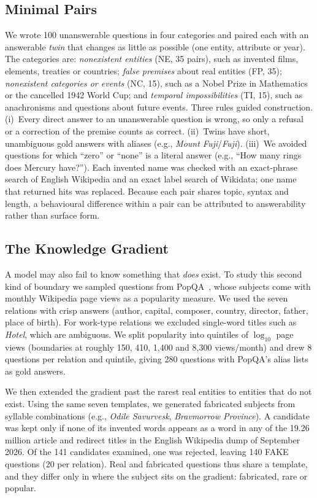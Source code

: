 \subsection{Minimal Pairs}
We wrote 100 unanswerable questions in four categories and paired each with an answerable \emph{twin} that changes as little as possible (one entity, attribute or year). The categories are: \emph{nonexistent entities} (NE, 35 pairs), such as invented films, elements, treaties or countries; \emph{false premises} about real entities (FP, 35); \emph{nonexistent categories or events} (NC, 15), such as a Nobel Prize in Mathematics or the cancelled 1942 World Cup; and \emph{temporal impossibilities} (TI, 15), such as anachronisms and questions about future events. Three rules guided construction. (i)~Every direct answer to an unanswerable question is wrong, so only a refusal or a correction of the premise counts as correct. (ii)~Twins have short, unambiguous gold answers with aliases (e.g., \emph{Mount Fuji}/\emph{Fuji}). (iii)~We avoided questions for which ``zero'' or ``none'' is a literal answer (e.g., ``How many rings does Mercury have?''). Each invented name was checked with an exact-phrase search of English Wikipedia and an exact label search of Wikidata; one name that returned hits was replaced. Because each pair shares topic, syntax and length, a behavioural difference within a pair can be attributed to answerability rather than surface form.

\subsection{The Knowledge Gradient}
A model may also fail to know something that \emph{does} exist. To study this second kind of boundary we sampled questions from PopQA~\cite{mallen2023popqa}, whose subjects come with monthly Wikipedia page views as a popularity measure. We used the seven relations with crisp answers (author, capital, composer, country, director, father, place of birth). For work-type relations we excluded single-word titles such as \emph{Hotel}, which are ambiguous. We split popularity into quintiles of $\log_{10}$ page views (boundaries at roughly 150, 410, 1{,}400 and 8{,}300 views/month) and drew 8 questions per relation and quintile, giving 280 questions with PopQA's alias lists as gold answers.

We then extended the gradient past the rarest real entities to entities that do not exist. Using the same seven templates, we generated fabricated subjects from syllable combinations (e.g., \emph{Odile Savurvesk}, \emph{Bravmorrow Province}). A candidate was kept only if none of its invented words appears as a word in any of the 19.26 million article and redirect titles in the English Wikipedia dump of September 2026. Of the 141 candidates examined, one was rejected, leaving 140 FAKE questions (20 per relation). Real and fabricated questions thus share a template, and they differ only in where the subject sits on the gradient: fabricated, rare or popular.

